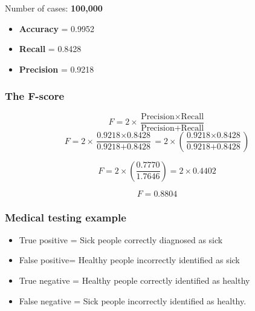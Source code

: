\documentclass[a4]{beamer}
\begin{document}
\begin{frame}
	\Large
	Number of cases: \textbf{100,000}\\ 
%		
%				
%	
	\begin{itemize}
		\item \textbf{Accuracy} = 0.9952
		\item \textbf{Recall} = 0.8428
		\item \textbf{Precision} = 0.9218
	\end{itemize}
\end{frame}
\begin{frame}
	\frametitle{The F-score}
	\Large
	\[ F = 2 \times \frac{\mbox{Precision} \times \mbox{Recall}}{\mbox{Precision} + \mbox{Recall}}\]\bigskip
	\[ F = 2 \times \frac{\mbox{0.9218} \times \mbox{0.8428}}{\mbox{0.9218} + \mbox{0.8428}} = 2 \times \left( \frac{\mbox{0.9218} \times \mbox{0.8428}}{\mbox{0.9218} + \mbox{0.8428}} \right)\]



	
	\[ F = 2 \times \left( \frac{0.7770}{1.7646} \right) = 2 \times 0.4402 \]
		
		\[F = 0.8804\] 
	
\end{frame}

\begin{frame}
	\frametitle{Medical testing example}
	\begin{itemize}
		\item True positive = Sick people correctly diagnosed as sick
		
		\item False positive= Healthy people incorrectly identified as sick
		
		\item True negative = Healthy people correctly identified as healthy
		
		\item False negative = Sick people incorrectly identified as healthy.
	\end{itemize}
\end{frame}
\end{document}

